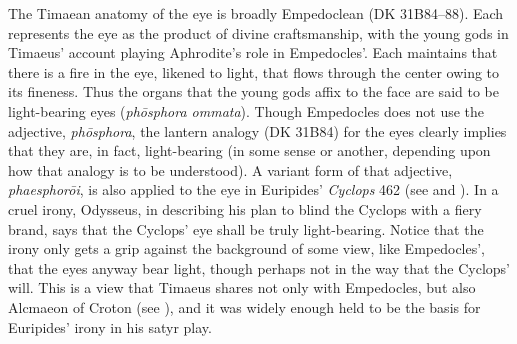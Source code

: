 The Timaean anatomy of the eye is broadly Empedoclean (DK 31B84--88). Each represents the eye as the product of divine craftsmanship, with the young gods in Timaeus' account playing Aphrodite's role in Empedocles'. Each maintains that there is a fire in the eye, likened to light, that flows through the center owing to its fineness. Thus the organs that the young gods affix to the face are said to be light-bearing eyes (\emph{phōsphora ommata}). Though Empedocles does not use the adjective, \emph{phōsphora}, the lantern analogy (DK 31B84) for the eyes clearly implies that they are, in fact, light-bearing (in some sense or another, depending upon how that analogy is to be understood). A variant form of that adjective, \emph{phaesphorōi}, is also applied to the eye in Euripides' \emph{Cyclops} 462 (see \citealt[489-90]{Seaford:1984vb} and \citealt[114]{Johansen:2004dx}). In a cruel irony, Odysseus, in describing his plan to blind the Cyclops with a fiery brand, says that the Cyclops' eye shall be truly light-bearing. Notice that the irony only gets a grip against the background of some view, like Empedocles', that the eyes anyway bear light, though perhaps not in the way that the Cyclops' will. This is a view that Timaeus shares not only with Empedocles, but also Alcmaeon of Croton (see \citealt[11--13]{Beare:1906uq}), and it was widely enough held to be the basis for Euripides' irony in his satyr play.


